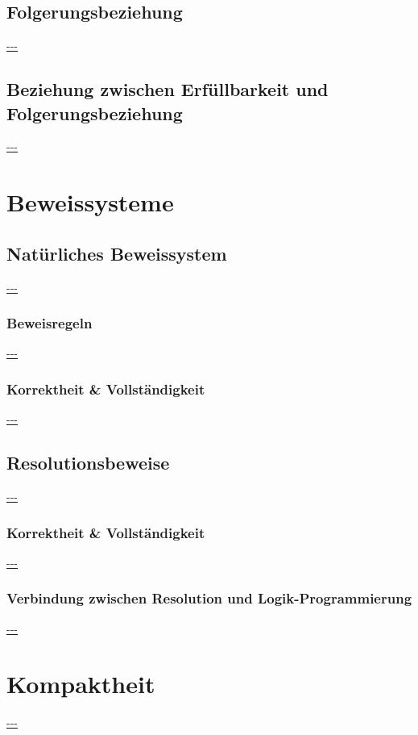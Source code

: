 \documentclass[twocolumn]{article}
\begin{document}
    \subsection{Folgerungsbeziehung}
    \url{---}\\

    \subsection{Beziehung zwischen Erfüllbarkeit und Folgerungsbeziehung}
    \url{---}\\

    \section{Beweissysteme}

    \subsection{Natürliches Beweissystem}
    \url{---}\\

    \subsubsection{Beweisregeln}
    \url{---}\\

    \subsubsection{Korrektheit \& Vollständigkeit}
    \url{---}\\

    \subsection{Resolutionsbeweise}
    \url{---}\\

    \subsubsection{Korrektheit \& Vollständigkeit}
    \url{---}\\

    \subsubsection{Verbindung zwischen Resolution und Logik-Programmierung}
    \url{---}\\

    \section{Kompaktheit}
    \url{---}\\
\end{document}
